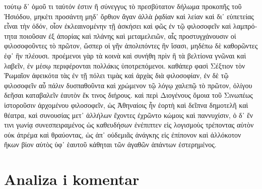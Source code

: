 {\large

\begin{greek}

\noindent τούτῳ δ᾽ ὁμοῦ τι ταὐτόν ἐστιν ἢ σύνεγγυς τὸ πρεσβύτατον δήλωμα προκοπῆς τοῦ Ἡσιόδου, μηκέτι προσάντη μηδ᾽ ὄρθιον ἄγαν ἀλλὰ ῥᾳδίαν καὶ λείαν καὶ δι᾽ εὐπετείας εἶναι τὴν ὁδόν, οἷον ἐκλεαινομένην τῇ ἀσκήσει καὶ φῶς ἐν τῷ φιλοσοφεῖν καὶ λαμπρότητα ποιοῦσαν ἐξ ἀπορίας καὶ πλάνης καὶ μεταμελειῶν, αἷς προστυγχάνουσιν οἱ φιλοσοφοῦντες τὸ πρῶτον, ὥσπερ οἱ γῆν ἀπολιπόντες ἣν ἴσασι, μηδέπω δὲ καθορῶντες ἐφ᾽ ἣν πλέουσι. προέμενοι γὰρ τὰ κοινὰ καὶ συνήθη πρὶν ἢ τὰ βελτίονα γνῶναι καὶ λαβεῖν, ἐν μέσῳ περιφέρονται πολλάκις ὑποτρεπόμενοι. καθάπερ φασὶ Σέξτιον τὸν Ῥωμαῖον ἀφεικότα τὰς ἐν τῇ πόλει τιμὰς καὶ ἀρχὰς διὰ φιλοσοφίαν, ἐν δὲ τῷ φιλοσοφεῖν αὖ πάλιν δυσπαθοῦντα καὶ χρώμενον τῷ λόγῳ χαλεπῷ τὸ πρῶτον, ὀλίγου δεῆσαι καταβαλεῖν ἑαυτὸν ἔκ τινος διήρους. καὶ περὶ Διογένους ὅμοια τοῦ Σινωπέως ἱστοροῦσιν ἀρχομένου φιλοσοφεῖν, ὡς Ἀθηναίοις ἦν ἑορτὴ καὶ δεῖπνα δημοτελῆ καὶ θέατρα, καὶ συνουσίας μετ᾽ ἀλλήλων ἔχοντες ἐχρῶντο κώμοις καὶ παννυχίσιν, ὁ δ᾽ ἔν τινι γωνίᾳ συνεσπειραμένος ὡς καθευδήσων ἐνέπιπτεν εἰς λογισμοὺς τρέποντας αὐτὸν οὐκ ἀτρέμα καὶ θραύοντας, ὡς ἀπ᾽ οὐδεμιᾶς ἀνάγκης εἰς ἐπίπονον καὶ ἀλλόκοτον ἥκων βίον αὐτὸς ὑφ᾽ ἑαυτοῦ κάθηται τῶν ἀγαθῶν ἁπάντων ἐστερημένος.

\end{greek}

}


\section*{Analiza i komentar}


